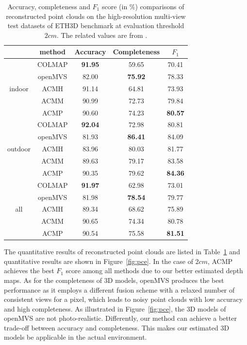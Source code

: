 \documentclass[letterpaper]{article} %
\begin{document}
\begin{table}[!htb]
	\caption{Accuracy, completeness and $F_{1}$ score (in $\%$) comparisons of reconstructed point clouds on the high-resolution multi-view test datasets of ETH3D benchmark at evaluation threshold $2cm$. The related values are from \cite{Schops2017ETH3D}.}
	\centering
	\footnotesize %
	\begin{tabular}{ccccc}
		\toprule
		& method & Accuracy & Completeness & $F_{1}$ \\
		\midrule
		\multirow{5}{*}{indoor} & COLMAP & {\bf 91.95} & 59.65 & 70.41 \\
		& openMVS & 82.00 & {\bf 75.92} & 78.33 \\
		& ACMH & 91.14 & 64.81 & 73.93 \\
		& ACMM & 90.99 & 72.73 & 79.84 \\
		& ACMP & 90.60 & 74.23 & {\bf 80.57} \\
		\midrule
		\multirow{5}{*}{outdoor} & COLMAP &  {\bf 92.04} & 72.98 & 80.81 \\
		& openMVS & 81.93 & {\bf 86.41} & 84.09 \\
		& ACMH & 83.96 & 80.03 & 81.77 \\
		& ACMM & 89.63 & 79.17 & 83.58 \\
		& ACMP & 90.35 & 79.62 & {\bf 84.36} \\
		\midrule
		\multirow{5}{*}{all} & COLMAP & {\bf 91.97} & 62.98 & 73.01 \\
		& openMVS & 81.98 & {\bf 78.54} & 79.77 \\
		& ACMH & 89.34 & 68.62 & 75.89 \\
		& ACMM & 90.65 & 74.34 & 80.78  \\
		& ACMP & 90.54 & 75.58 & {\bf 81.51} \\
		\bottomrule
	\end{tabular}
\label{tab:pointcloud}
\end{table}

 The quantitative results of reconstructed point clouds are listed in Table~\ref{tab:pointcloud} and quantitative results are shown in Figure~\ref{fig:pce}. In the case of $2cm$, ACMP achieves the best $F_{1}$ score among all methods due to our better estimated depth maps. As for the completeness of 3D models, openMVS produces the best performance as it employs a different fusion scheme with a relaxed number of consistent views for a pixel, which leads to noisy point clouds with low accuracy and high completeness. As illustrated in Figure~\ref{fig:pce}, the 3D models of openMVS are not photo-realistic. Differently, our method can achieve a better trade-off between accuracy and completeness. This makes our estimated 3D models be applicable in the actual environment.
\end{document}
